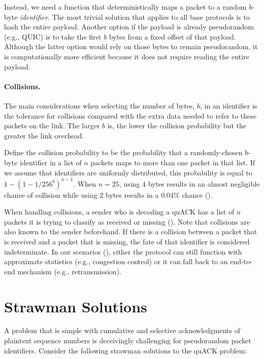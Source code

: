 Instead, we need a function that deterministically maps
a packet to a random $b$-byte \emph{identifier}. The most trivial solution
that applies to all base protocols is
to hash the entire payload. Another option if the payload is already
pseudorandom (e.g., QUIC) is to take the first $b$ bytes from a fixed
offset of that payload. Although the latter option would rely on those bytes
to remain pseudorandom, it is computationally more efficient because it
does not require reading the entire payload.

\paragraph{Collisions.}
The main considerations when selecting the number of bytes, $b$, in an
identifier is the tolerance for collisions compared with the extra data
needed to refer to these packets on the link. The larger $b$ is, the lower
the collision probability but the greater the link overhead.

Define the collision probability to be the probability that a randomly-chosen
$b$-byte identifier in a list of $n$ packets maps to more than one packet in
that list.
If we assume that identifiers are uniformly distributed,
this probability is equal to $1-(1 - 1/256^{b})^{n-1}$.
When $n=25$, using $4$ bytes results in an almost negligible chance of
collision while using $2$ bytes results in a 0.04\% chance
().


When handling collisions, a sender who is decoding a quACK has a list of $n$ packets it is
trying to classify as received or missing ().
Note that collisions are also known
to the sender beforehand. If there is a collision between
a packet that is received and a packet that is missing, the fate of that
identifier is considered indeterminate.
In our scenarios (), either the
protocol can still function
with approximate statistics (e.g., congestion control)
or it can fall back to an end-to-end mechanism (e.g., retransmission).

\section{Strawman Solutions}



A problem that is simple with cumulative and selective acknowledgments of
plaintext sequence numbers is deceivingly challenging for pseudorandom
packet identifiers. Consider the following strawman solutions to the quACK
problem:

